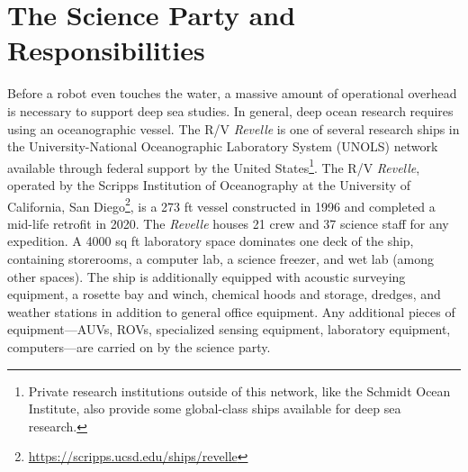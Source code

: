 \section{The Science Party and Responsibilities}
Before a robot even touches the water, a massive amount of operational overhead is necessary to support deep sea studies. In general, deep ocean research requires using an oceanographic vessel. The R/V \emph{Revelle} is one of several research ships in the University-National Oceanographic Laboratory System (UNOLS) network available through federal support by the United States\footnote{Private research institutions outside of this network, like the Schmidt Ocean Institute, also provide some global-class ships available for deep sea research.}. The R/V \emph{Revelle}, operated by the Scripps Institution of Oceanography at the University of California, San Diego\footnote{\url{https://scripps.ucsd.edu/ships/revelle}}, is a 273 ft vessel constructed in 1996 and completed a mid-life retrofit in 2020. The \emph{Revelle} houses 21 crew and 37 science staff for any expedition. A 4000 sq ft laboratory space dominates one deck of the ship, containing storerooms, a computer lab, a science freezer, and wet lab (among other spaces). The ship is additionally equipped with acoustic surveying equipment, a rosette bay and winch, chemical hoods and storage, dredges, and weather stations in addition to general office equipment. Any additional pieces of equipment---AUVs, ROVs, specialized sensing equipment, laboratory equipment, computers---are carried on by the science party.

